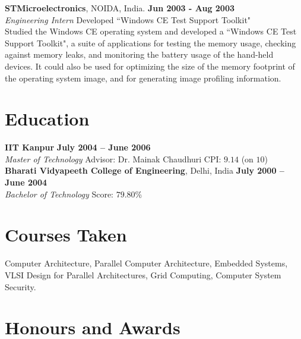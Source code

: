 \documentclass[margin,line]{resume}
\begin{document}
\begin{resume}
	\textbf{STMicroelectronics}, NOIDA, India. \hfill \textbf{Jun 2003 - Aug 2003}\vspace{2mm}\\\vspace{1mm}%
	\textsl{Engineering Intern} \hfill Developed ``Windows CE Test Support Toolkit"\\
	Studied the Windows CE operating system and developed a ``Windows CE Test Support Toolkit", a suite of applications for testing the memory usage, checking against memory leaks, and monitoring the battery usage of the hand-held devices. It could also be used for optimizing the size of the memory footprint of the operating system image, and for generating image profiling information.

	\section{\mysidestyle Education}

	\textbf{IIT Kanpur} \hfill \textbf{July 2004 -- June 2006}\\
	\textsl{Master of Technology} \hfill Advisor:  Dr. Mainak Chaudhuri \hfill CPI: $9.14$ (on $10$)\vspace{2mm}\\%
	\textbf{Bharati Vidyapeeth College of Engineering}, Delhi, India \hfill \textbf{July 2000 -- June 2004}\\
	\textsl{Bachelor of Technology} \hfill Score: $79.80$\%

	\section{\mysidestyle Courses Taken}
	Computer Architecture, Parallel Computer Architecture, Embedded Systems, VLSI Design for Parallel Architectures, Grid Computing, Computer System Security.

	\section{\mysidestyle Honours and Awards} 


\end{resume}
\end{document}
